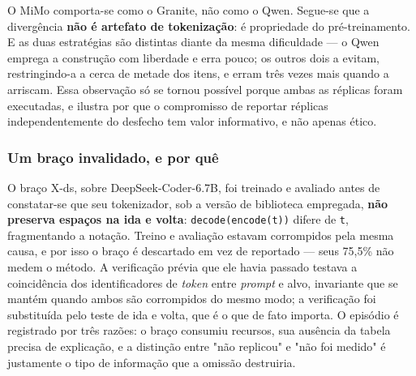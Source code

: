 \begin{table}[h!]
\end{table}

O MiMo comporta-se como o Granite, não como o Qwen. Segue-se que a divergência \textbf{não é artefato de tokenização}: é propriedade do pré-treinamento. E as duas estratégias são distintas diante da mesma dificuldade --- o Qwen emprega a construção com liberdade e erra pouco; os outros dois a evitam, restringindo-a a cerca de metade dos itens, e erram três vezes mais quando a arriscam. Essa observação só se tornou possível porque ambas as réplicas foram executadas, e ilustra por que o compromisso de reportar réplicas independentemente do desfecho tem valor informativo, e não apenas ético.

\subsubsection*{Um braço invalidado, e por quê}

O braço X-ds, sobre DeepSeek-Coder-6.7B, foi treinado e avaliado antes de constatar-se que seu tokenizador, sob a versão de biblioteca empregada, \textbf{não preserva espaços na ida e volta}: \verb|decode(encode(t))| difere de \verb|t|, fragmentando a notação. Treino e avaliação estavam corrompidos pela mesma causa, e por isso o braço é descartado em vez de reportado --- seus 75,5\% não medem o método. A verificação prévia que ele havia passado testava a coincidência dos identificadores de \textit{token} entre \textit{prompt} e alvo, invariante que se mantém quando ambos são corrompidos do mesmo modo; a verificação foi substituída pelo teste de ida e volta, que é o que de fato importa. O episódio é registrado por três razões: o braço consumiu recursos, sua ausência da tabela precisa de explicação, e a distinção entre "não replicou" e "não foi medido" é justamente o tipo de informação que a omissão destruiria.

